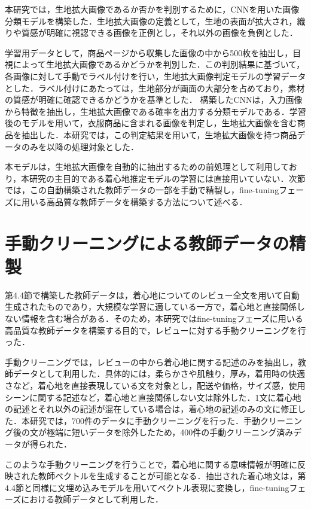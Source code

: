\documentclass[a4paper,12pt]{jreport}
\begin{document}
本研究では，生地拡大画像であるか否かを判別するために，CNNを用いた画像分類モデルを構築した．生地拡大画像の定義として，生地の表面が拡大され，織りや質感が明確に視認できる画像を正例とし，それ以外の画像を負例とした．

学習用データとして，商品ページから収集した画像の中から500枚を抽出し，目視によって生地拡大画像であるかどうかを判別した．この判別結果に基づいて，各画像に対して手動でラベル付けを行い，生地拡大画像判定モデルの学習データとした．ラベル付けにあたっては，生地部分が画面の大部分を占めており，素材の質感が明確に確認できるかどうかを基準とした．
構築したCNNは，入力画像から特徴を抽出し，生地拡大画像である確率を出力する分類モデルである．学習後のモデルを用いて，衣服商品に含まれる画像を判定し，生地拡大画像を含む商品を抽出した．本研究では，この判定結果を用いて，生地拡大画像を持つ商品データのみを以降の処理対象とした．

本モデルは，生地拡大画像を自動的に抽出するための前処理として利用しており，本研究の主目的である着心地推定モデルの学習には直接用いていない．次節では，この自動構築された教師データの一部を手動で精製し，fine-tuningフェーズに用いる高品質な教師データを構築する方法について述べる．

\section{手動クリーニングによる教師データの精製}
第4.4節で構築した教師データは，着心地についてのレビュー全文を用いて自動生成されたものであり，大規模な学習に適している一方で，着心地と直接関係しない情報を含む場合がある．そのため，本研究ではfine-tuningフェーズに用いる高品質な教師データを構築する目的で，レビューに対する手動クリーニングを行った．

手動クリーニングでは，レビューの中から着心地に関する記述のみを抽出し，教師データとして利用した．具体的には，柔らかさや肌触り，厚み，着用時の快適さなど，着心地を直接表現している文を対象とし，配送や価格，サイズ感，使用シーンに関する記述など，着心地と直接関係しない文は除外した．1文に着心地の記述とそれ以外の記述が混在している場合は，着心地の記述のみの文に修正した．本研究では，700件のデータに手動クリーニングを行った．手動クリーニング後の文が極端に短いデータを除外したため，400件の手動クリーニング済みデータが得られた．

このような手動クリーニングを行うことで，着心地に関する意味情報が明確に反映された教師ベクトルを生成することが可能となる．抽出された着心地文は，第4.4節と同様に文埋め込みモデルを用いてベクトル表現に変換し，fine-tuningフェーズにおける教師データとして利用した．
\end{document}
